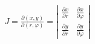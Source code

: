 \documentclass[preview]{standalone}
\begin{document}
\begin{align*}
J = \frac{\partial(x, y)}{\partial(r, \varphi)} = \left| \begin{array}{cc}\frac{\partial x}{\partial r} & \frac{\partial x}{\partial \varphi} \\\frac{\partial y}{\partial r} & \frac{\partial y}{\partial \varphi}\end{array} \right|
\end{align*}
\end{document}
